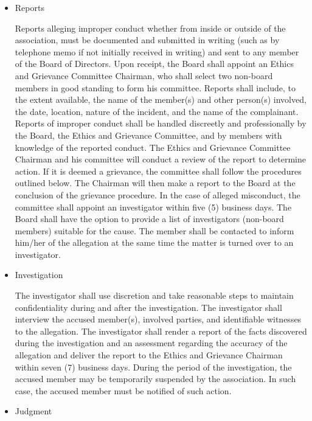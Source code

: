 \documentclass[letterpaper,11pt,colorlinks=true,allcolors=blue]{article}
\begin{document}
\begin{itemize}
\item Reports

Reports alleging improper conduct whether from inside or outside of the association, must be documented and submitted in writing (such as by telephone memo if not initially received in writing) and sent to any member of the Board of Directors. Upon receipt, the Board shall appoint an Ethics and Grievance Committee Chairman, who shall select two non-board members in good standing to form his committee.  Reports shall include, to the extent available, the name of the member(s) and other person(s) involved, the date, location, nature of the incident, and the name of the complainant.  Reports of improper conduct shall be handled discreetly and professionally by the Board, the Ethics and Grievance Committee, and by members with knowledge of the reported conduct.  The Ethics and Grievance Committee Chairman and his committee will conduct a review of the report to determine action.  If it is deemed a grievance, the committee shall follow the procedures outlined below.  The Chairman will then make a report to the Board at the conclusion of the grievance procedure.  In the case of alleged misconduct, the committee shall appoint an investigator within five (5) business days.  The Board shall have the option to provide a list of investigators (non-board members) suitable for the cause.  The member shall be contacted to inform him/her of the allegation at the same time the matter is turned over to an investigator.

\item Investigation

The investigator shall use discretion and take reasonable steps to maintain confidentiality during and after the investigation. The investigator shall interview the accused member(s), involved parties, and identifiable witnesses to the allegation. The investigator shall render a report of the facts discovered during the investigation and an assessment regarding the accuracy of the allegation and deliver the report to the Ethics and Grievance Chairman within seven (7) business days.  During the period of the investigation, the accused member may be temporarily suspended by the association. In such case, the accused member must be notified of such action.

\item Judgment


\end{itemize}
\end{document}
